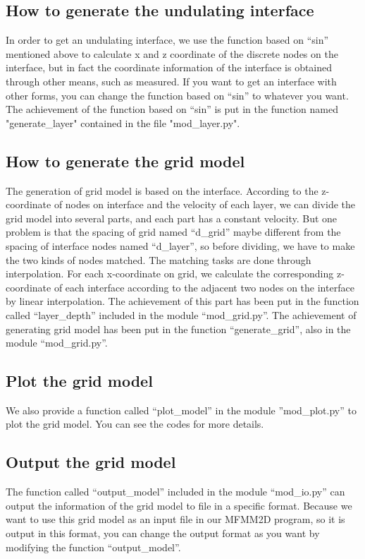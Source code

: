 \subsection{How to generate the undulating interface}
\indent In order to get an undulating interface, we use the function based on ``sin'' mentioned 
above to calculate x and z coordinate of the discrete nodes on the interface, but in fact 
the coordinate information of the interface is obtained through other means, such as measured.
If you want to get an interface with other forms, you can change the function based on ``sin''
to whatever you want. The achievement of the function based on ``sin'' is put in the function 
named "generate\_layer" contained in the file "mod\_layer.py". \\[5pt]

\subsection{How to generate the grid model}
The generation of grid model is based on the interface. According to the z-coordinate of nodes
on interface and the velocity of each layer, we can divide the grid model into several parts,
and each part has a constant velocity. But one problem is that the spacing of grid named
``d\_grid'' maybe different from the spacing of interface nodes named ``d\_layer'', so before
dividing, we have to make the two kinds of nodes matched. The matching tasks are done through
interpolation. For each x-coordinate on grid, we calculate the corresponding z-coordinate of
each interface according to the adjacent two nodes on the interface by linear interpolation.
The achievement of this part has been put in the function called ``layer\_depth'' included in
the module ``mod\_grid.py''. The achievement of generating grid model has been put in the 
function ``generate\_grid'', also in the module ``mod\_grid.py''. \\[5pt]

\subsection{Plot the grid model}
We also provide a function called ``plot\_model'' in the module ''mod\_plot.py'' to plot the
grid model. You can see the codes for more details. \\[5pt]

\subsection{Output the grid model}
The function called ``output\_model'' included in the module ``mod\_io.py'' can output the
information of the grid model to file in a specific format. Because we want to use this grid
model as an input file in our MFMM2D program, so it is output in this format, you can change
the output format as you want by modifying the function ``output\_model''. \\[5pt]

